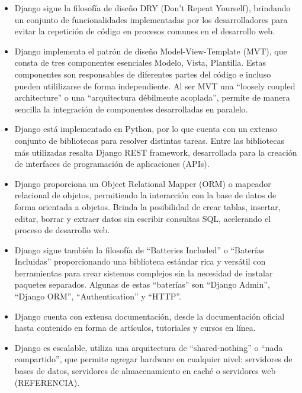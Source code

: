 \begin{itemize}
    \item Django sigue la filosofía
    de diseño DRY (Don't Repeat Yourself), brindando un conjunto de funcionalidades implementadas
    por los desarrolladores para evitar la repetición de código en procesos
    comunes en el desarrollo web.
    \item Django implementa el patrón de diseño Model-View-Template (MVT), que
    consta de tres componentes esenciales Modelo, Vista,
    Plantilla. Estas componentes son responsables de diferentes
    partes del código e incluso pueden utililizarse de forma independiente. Al ser MVT una 
    ``loosely coupled architecture'' o una ``arquitectura
    débilmente acoplada'', permite de manera sencilla la integración de componentes
    desarrolladas en paralelo.
    \item Django está implementado en Python, por lo que cuenta con un 
    extenso conjunto de bibliotecas para resolver distintas tareas. Entre
    las bibliotecas más utilizadas resalta Django REST framework, desarrollada 
    para la creación de interfaces de programación de aplicaciones (APIs).
    \item Django proporciona un Object Relational Mapper (ORM) o mapeador
    relacional de objetos, permitiendo la interacción con la base de datos
    de forma orientada a objetos. Brinda la posibilidad de crear tablas, insertar,
    editar, borrar y extraer datos sin escribir consultas SQL, acelerando el proceso
    de desarrollo web. 
    \item Django sigue también la filosofía de ``Batteries Included'' o ``Baterías Incluidas''
    proporcionando una biblioteca estándar rica y versátil con herramientas para
    crear sistemas complejos sin la necesidad de instalar paquetes separados. Algunas de 
    estas ``baterías'' son ``Django Admin'', ``Django ORM'', ``Authentication'' y
    ``HTTP''.
    \item Django cuenta con extensa documentación, desde la documentación oficial hasta 
    contenido en forma de artículos, tutoriales y cursos en línea.
    \item Django es escalable, utiliza una arquitectura de ``shared-nothing'' o ``nada compartido'',
    que permite agregar hardware en cualquier nivel: servidores de bases de datos,
    servidores de almacenamiento en caché o servidores web (REFERENCIA).

\end{itemize}

 


